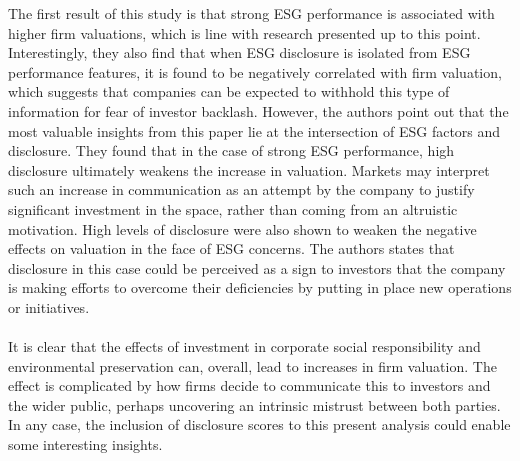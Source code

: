 {The first result of this study is that strong ESG performance is associated with higher firm valuations, which is line with research presented up to this point. Interestingly, they also find that when ESG disclosure is isolated from ESG performance features, it is found to be negatively correlated with firm valuation, which suggests that companies can be expected to withhold this type of information for fear of investor backlash. However, the authors point out that the most valuable insights from this paper lie at the intersection of ESG factors and disclosure. They found that in the case of strong ESG performance, high disclosure ultimately weakens the increase in valuation. Markets may interpret such an increase in communication as an attempt by the company to justify significant investment in the space, rather than coming from an altruistic motivation. High levels of disclosure were also shown to weaken the negative effects on valuation in the face of ESG concerns. The authors states that disclosure in this case could be perceived as a sign to investors that the company is making efforts to overcome their deficiencies by putting in place new operations or initiatives. \\\\
It is clear that the effects of investment in corporate social responsibility and environmental preservation can, overall, lead to increases in firm valuation. The effect is complicated by how firms decide to communicate this to investors and the wider public, perhaps uncovering an intrinsic mistrust between both parties. In any case, the inclusion of disclosure scores to this present analysis could enable some interesting insights. 

}
